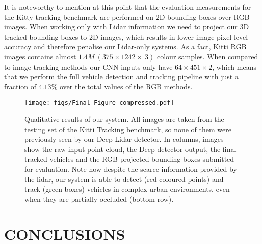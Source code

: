 \documentclass[letterpaper, 10 pt, conference]{ieeeconf}  %
\begin{document}
It is noteworthy to mention at this point that the evaluation measurements for the Kitty tracking benchmark are performed on 2D bounding boxes over RGB images. When working only with Lidar information we need to project our 3D tracked bounding boxes to 2D images, which results in lower image pixel-level accuracy and therefore penalise our Lidar-only systems. 
As a fact, Kitti RGB images contains almost $1.4M~(375\!\times1242\!\times~3)$ colour samples. When compared to image tracking methods our CNN inputs only have $64\!\times451\!\times2$, which means that we perform the full vehicle detection and tracking pipeline with just a fraction of $4.13\%$ over the total values of the RGB methods.

\begin{figure*}[t]
\centering
 \centerline{
  	\texttt{[image: figs/Final\_Figure\_compressed.pdf]}}
  \caption{Qualitative results of our system. All images are taken from the testing set of the Kitti Tracking benchmark, so none of them were previously seen by our Deep Lidar detector. In columns, images show the raw input point cloud, the Deep detector output, the final tracked vehicles and the RGB projected bounding boxes submitted for evaluation. Note how despite the scarce information provided by the lidar, our system is able to detect (red coloured points) and track (green boxes) vehicles in complex urban environments, even when they are partially occluded  (bottom row).}
  \label{fig:res}
\end{figure*}
\section{CONCLUSIONS}
\end{document}
